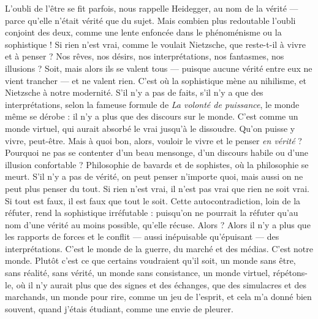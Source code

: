 L’oubli de l’être se fit parfois, nous rappelle Heidegger, au nom de la vérité
— parce qu’elle n’était vérité que du sujet. Mais combien plus redoutable
l’oubli conjoint des deux, comme une lente enfoncée dans le phénoménisme
ou la sophistique ! Si rien n’est vrai, comme le voulait Nietzsche, que reste-t-il
à vivre et à penser ? Nos rêves, nos désirs, nos interprétations, nos fantasmes,
nos illusions ? Soit, mais alors ils se valent tous — puisque aucune vérité entre
eux ne vient trancher — et ne valent rien. C’est où la sophistique mène au nihilisme,
et Nietzsche à notre modernité. S’il n’y a pas de faits, s’il n’y a que des
interprétations, selon la fameuse formule de {\it La volonté de puissance}, le monde
même se dérobe : il n’y a plus que des discours sur le monde. C’est comme un
monde virtuel, qui aurait absorbé le vrai jusqu’à le dissoudre. Qu’on puisse y
vivre, peut-être. Mais à quoi bon, alors, vouloir le vivre et le penser {\it en vérité} ?
Pourquoi ne pas se contenter d’un beau mensonge, d’un discours habile ou
d’une illusion confortable ? Philosophie de bavards et de sophistes, où la philosophie
se meurt. S’il n’y a pas de vérité, on peut penser n’importe quoi, mais
aussi on ne peut plus penser du tout. Si rien n’est vrai, il n’est pas vrai que rien
ne soit vrai. Si tout est faux, il est faux que tout le soit. Cette autocontradiction,
loin de la réfuter, rend la sophistique irréfutable : puisqu'on ne pourrait la
réfuter qu’au nom d’une vérité au moins possible, qu’elle récuse. Alors ? Alors
il n’y a plus que les rapports de forces et le conflit — aussi inépuisable qu’épuisant
— des interprétations. C’est le monde de la guerre, du marché et des
médias. C’est notre monde. Plutôt c’est ce que certains voudraient qu’il soit, un
monde sans être, sans réalité, sans vérité, un monde sans consistance, un
monde virtuel, répétons-le, où il n’y aurait plus que des signes et des échanges,
que des simulacres et des marchands, un monde pour rire, comme un jeu de
l'esprit, et cela m’a donné bien souvent, quand j'étais étudiant, comme une
envie de pleurer.

